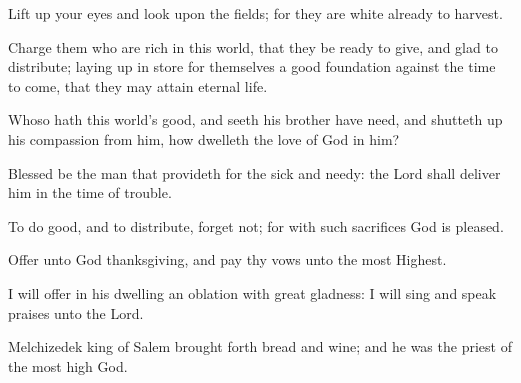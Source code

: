 Lift up your eyes and look upon the fields; for they are white already to harvest.

Charge them who are rich in this world, that they be ready to give, and glad to distribute; laying up in store for themselves a good foundation against the time to come, that they may attain eternal life.

Whoso hath this world’s good, and seeth his brother have need, and shutteth up his compassion from him, how dwelleth the love of God in him?

Blessed be the man that provideth for the sick and needy: the Lord shall deliver him in the time of trouble.

To do good, and to distribute, forget not; for with such sacrifices God is pleased.

Offer unto God thanksgiving, and pay thy vows unto the most Highest.

I will offer in his dwelling an oblation with great gladness: I will sing and speak praises unto the Lord.

Melchizedek king of Salem brought forth bread and wine; and he was the priest of the most high God.







